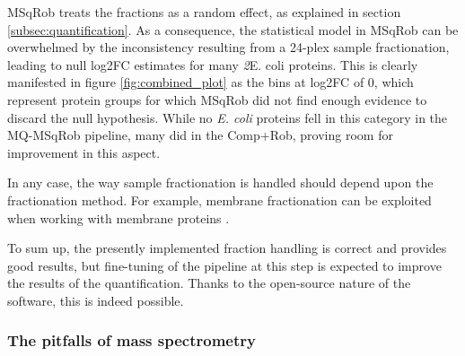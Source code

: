 MSqRob treats the fractions as a random effect, as explained in section \ref{subsec:quantification}. As a consequence, the statistical model in MSqRob can be overwhelmed by the inconsistency resulting from a 24-plex sample fractionation, leading to null \ac{log2FC} estimates for many \textit2{E. coli} proteins. This is clearly manifested in figure \ref{fig:combined_plot} as the bins at \ac{log2FC} of 0, which represent protein groups for which MSqRob did not find enough evidence to discard the null hypothesis. While no \textit{E. coli} proteins fell in this category in the MQ-MSqRob pipeline, many did in the Comp+Rob, proving room for improvement in this aspect.

In any case, the way sample fractionation is handled should depend upon the fractionation method. For example, membrane fractionation can be exploited when working with membrane proteins \cite{Marmagne2006}.

To sum up, the presently implemented fraction handling is correct and provides good results, but fine-tuning of the pipeline at this step is expected to improve the results of the quantification. Thanks to the open-source nature of the software, this is indeed possible.


%
%
%
%
%


\subsubsection{The pitfalls of mass spectrometry}

